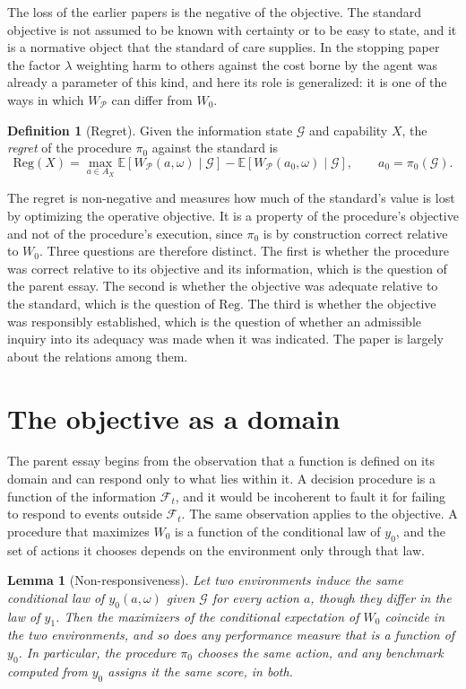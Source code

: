 \documentclass[11pt]{article}
\newcommand{\F}{\mathcal F}
\newcommand{\G}{\mathcal G}
\newcommand{\E}{\mathbb E}
\newcommand{\Reg}{\mathrm{Reg}}
\theoremstyle{plain}
\newtheorem{lemma}{Lemma}
\theoremstyle{definition}
\newtheorem{definition}{Definition}
\begin{document}
The loss of the earlier papers is the negative of the objective. The standard objective is not assumed to be known with certainty or to be easy to state, and it is a normative object that the standard of care supplies. In the stopping paper \cite{flyxion2026stop} the factor $\lambda$ weighting harm to others against the cost borne by the agent was already a parameter of this kind, and here its role is generalized: it is one of the ways in which $W_{\mathcal P}$ can differ from $W_0$.

\begin{definition}[Regret]\label{def:regret}
Given the information state $\G$ and capability $X$, the \emph{regret} of the procedure $\pi_0$ against the standard is
\[
\Reg(X)=\max_{a\in A_X}\E[W_{\mathcal P}(a,\omega)\mid\G]-\E[W_{\mathcal P}(a_0,\omega)\mid\G],\qquad a_0=\pi_0(\G).
\]
\end{definition}

The regret is non-negative and measures how much of the standard's value is lost by optimizing the operative objective. It is a property of the procedure's objective and not of the procedure's execution, since $\pi_0$ is by construction correct relative to $W_0$. Three questions are therefore distinct. The first is whether the procedure was correct relative to its objective and its information, which is the question of the parent essay. The second is whether the objective was adequate relative to the standard, which is the question of $\Reg$. The third is whether the objective was responsibly established, which is the question of whether an admissible inquiry into its adequacy was made when it was indicated. The paper is largely about the relations among them.

\section{The objective as a domain}\label{sec:domain}

The parent essay begins from the observation that a function is defined on its domain and can respond only to what lies within it. A decision procedure is a function of the information $\F_t$, and it would be incoherent to fault it for failing to respond to events outside $\F_t$. The same observation applies to the objective. A procedure that maximizes $W_0$ is a function of the conditional law of $y_0$, and the set of actions it chooses depends on the environment only through that law.

\begin{lemma}[Non-responsiveness]\label{lem:blind}
Let two environments induce the same conditional law of $y_0(a,\omega)$ given $\G$ for every action $a$, though they differ in the law of $y_1$. Then the maximizers of the conditional expectation of $W_0$ coincide in the two environments, and so does any performance measure that is a function of $y_0$. In particular, the procedure $\pi_0$ chooses the same action, and any benchmark computed from $y_0$ assigns it the same score, in both.
\end{lemma}
\end{document}
